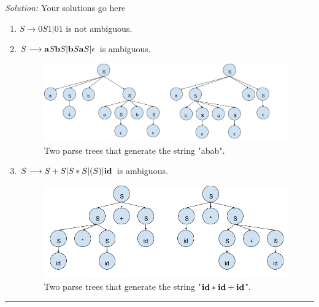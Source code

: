 \documentclass[a4paper, 11pt]{article}
\newenvironment{solution}
    {\textit{Solution:}}
    {}
\begin{document}
\begin{solution}
    Your solutions go here
    \begin{enumerate}[a]
        \item  $S \longrightarrow 0 S 1 | 0 1 $ is not ambiguous.

        \item $S \longrightarrow {\bf a} S {\bf b} S | {\bf b} S {\bf a} S | \epsilon $ is ambiguous.

              \begin{figure}[H]
                  \centering
                  \includegraphics[scale=0.35]{337ps1q2b.png}
                  \caption{Two parse trees that generate the string "abab".}
                  \label{fig_2b}
              \end{figure}

        \item $S \longrightarrow  S + S | S * S | (S) | {\bf id}  $ is ambiguous.

              \begin{figure}[H]
                  \centering
                  \includegraphics[scale=0.4]{337ps1q2c.png}
                  \caption{Two parse trees that generate the string "${\bf id} * {\bf id} + {\bf id}$".}
                  \label{fig_2c}
              \end{figure}

    \end{enumerate}
\end{solution}
\noindent\rule{7in}{2.8pt}

\end{document}
